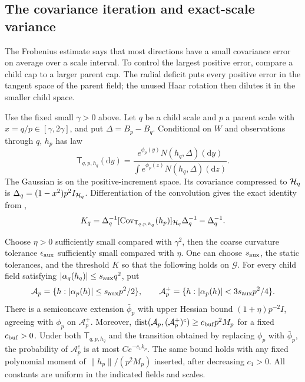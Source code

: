 \subsection{The covariance iteration and exact-scale variance}

The Frobenius estimate says that most directions have a small covariance
error on average over a scale interval.  To control the largest positive
error, compare a child cap to a larger parent cap.  The radial deficit
puts every positive error in the tangent space of the parent field;
the unused Haar rotation then dilutes it in the smaller child space.

Use the fixed small \(\gamma>0\) above.  Let \(q\) be a child scale and \(p\) a parent
scale with \(x=q/p\in[\gamma,2\gamma]\), and put \(\Delta=B_p-B_q\).
Conditional on \(W\) and observations through \(q\), \(h_p\) has law
\begin{equation}\label{edge:transition}
 \mathsf T_{q,p,h_q}(\mathrm dy)
 =\frac{e^{\phi_p(y)}N(h_q,\Delta)(\mathrm dy)}
        {\int e^{\phi_p(z)}N(h_q,\Delta)(\mathrm dz)} .
\end{equation}
The Gaussian is on the positive-increment space.  Its covariance
compressed to \(\mathcal H_q\) is
\(\Delta_q=(1-x^2)p^2I_{\mathcal H_q}\).  Differentiation of the convolution
gives the exact identity from \cite[Section~4.1, Equation~(4.3)]{FUA},
\begin{equation}\label{edge:transition-covariance}
 K_q=\Delta_q^{-1}
       [\operatorname{Cov}_{\mathsf T_{q,p,h_q}}(h_p)]_{\mathcal H_q}\Delta_q^{-1}
       -\Delta_q^{-1}.
\end{equation}

\begin{lemma}
\label{edge:annular-extension}
Choose \(\eta>0\) sufficiently small compared with \(\gamma^2\), then
the coarse curvature tolerance \(\epsilon_{\rm aux}\) sufficiently small
compared with \(\eta\).  One can choose \(s_{\rm aux}\), the static tolerances,
and the threshold \(K\) so that the following holds on \(\mathcal G\).
For every child field satisfying \(|\alpha_q(h_q)|\le s_{\rm aux}q^2\), put
\[
 \mathcal A_p=\{h:|\alpha_p(h)|\le s_{\rm aux}p^2/2\},\qquad
 \mathcal A_p^+=\{h:|\alpha_p(h)|<3s_{\rm aux}p^2/4\}.
\]
There is a semiconcave extension \(\bar\phi_p\) with upper Hessian bound
\((1+\eta)p^{-2}I\), agreeing with \(\phi_p\) on \(\mathcal A_p^+\).
Moreover,
\(\operatorname{dist}(\mathcal A_p,(\mathcal A_p^+)^c)\ge c_{\rm buf}p^2M_p\)
for a fixed \(c_{\rm buf}>0\).  Under both \(\mathsf T_{q,p,h_q}\)
and the transition obtained by replacing \(\phi_p\) with \(\bar\phi_p\),
the probability of \(\mathcal A_p^c\) is at most \(Ce^{-c_1k_p}\).
The same bound holds with any fixed polynomial
moment of \(\|h_p\|/(p^2M_p)\) inserted, after decreasing \(c_1>0\).
All constants are uniform in the indicated fields and scales.
\end{lemma}

